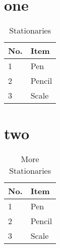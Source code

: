 \documentclass{article}
\begin{document}
	
	\tableofcontents
	\listoftables %
	
	\section{one}
	\lipsum[1-2]
	
	\begin{table}[b] %
		\centering
		\begin{tabular}{|l|l|}
			\hline
			No. & Item \\
			\hline
			1 & Pen \\
			\hline
			2 & Pencil \\
			\hline
			3 & Scale \\
			\hline
		\end{tabular}
		\caption{Stationaries}
	\end{table}
	
	\section{two}
	\lipsum[1-3]
	
	\begin{table}[h] %
		\centering
		\begin{tabular}{|l|l|}
			\hline
			No. & Item \\
			\hline
			1 & Pen \\
			\hline
			2 & Pencil \\
			\hline
			3 & Scale \\
			\hline
		\end{tabular}
		\caption{More Stationaries}
	\end{table}
	
\end{document}
